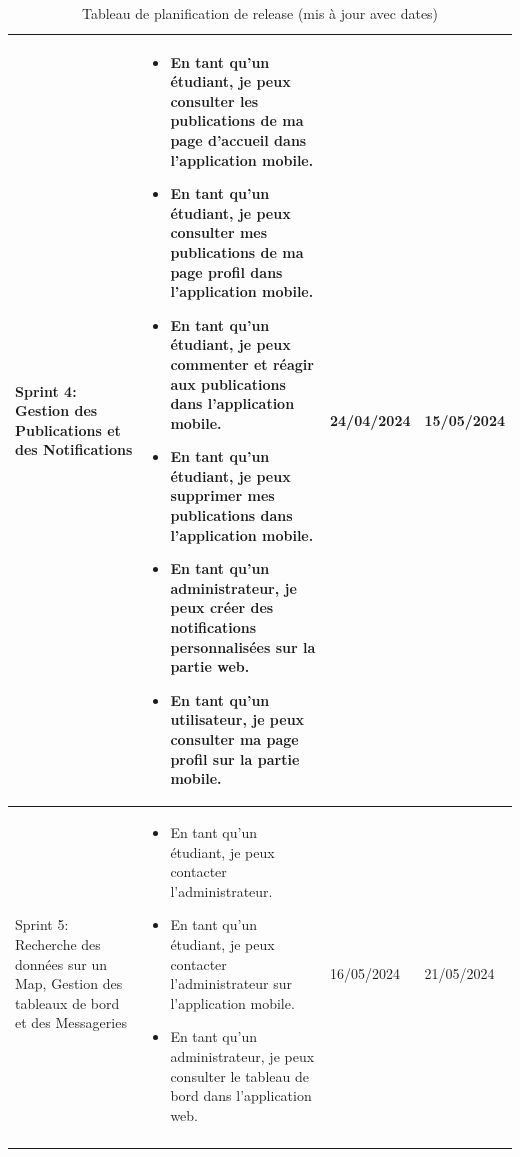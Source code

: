 \begin{sloppypar}
\begin{center}
\begin{longtable}{|>{\raggedright}p{2.8cm}|>{\raggedright}p{8cm}|>{\raggedright\arraybackslash\small}p{1.9cm}|>{\raggedright\arraybackslash\small}p{1.8cm}|}
Sprint 4: Gestion des Publications et des Notifications & 
\begin{itemize}
    \vspace{-0.8cm}
    \vspace{-0.2cm}
    \setlength{\leftskip}{-0.4cm}
    \item En tant qu’un étudiant, je peux consulter les publications de ma page d’accueil dans l’application mobile.
    \vspace{-0.2cm}
    \item En tant qu’un étudiant, je peux consulter mes publications de ma page profil dans l’application mobile.
    \vspace{-0.2cm}
    \item En tant qu’un étudiant, je peux commenter et réagir aux publications dans l’application mobile.
    \vspace{-0.2cm}
    \item En tant qu’un étudiant, je peux supprimer mes publications dans l’application mobile.
    \vspace{-0.2cm}
    \item En tant qu’un administrateur, je peux créer des notifications personnalisées sur la partie web.
    \vspace{-0.2cm}
    \item En tant qu’un utilisateur, je peux consulter ma page profil sur la partie mobile.
\end{itemize}
& 24/04/2024 & 15/05/2024 \\
\hline

Sprint 5: Recherche des données sur un Map, Gestion des tableaux de bord et des Messageries & 
\begin{itemize}
    \vspace{-0.8cm}
    \vspace{-0.2cm}
    \setlength{\leftskip}{-0.4cm}
    \item En tant qu’un étudiant, je peux contacter l’administrateur.
    \vspace{-0.2cm}
    \item En tant qu’un étudiant, je peux contacter l’administrateur sur l'application mobile.
    \vspace{-0.2cm}
    \item En tant qu’un administrateur, je peux consulter le tableau de bord dans l’application web.
\end{itemize}
& 16/05/2024 & 21/05/2024 \\
\hline

\caption{Tableau de planification de release (mis à jour avec dates)}
\end{longtable}
\end{center}


\end{sloppypar}
